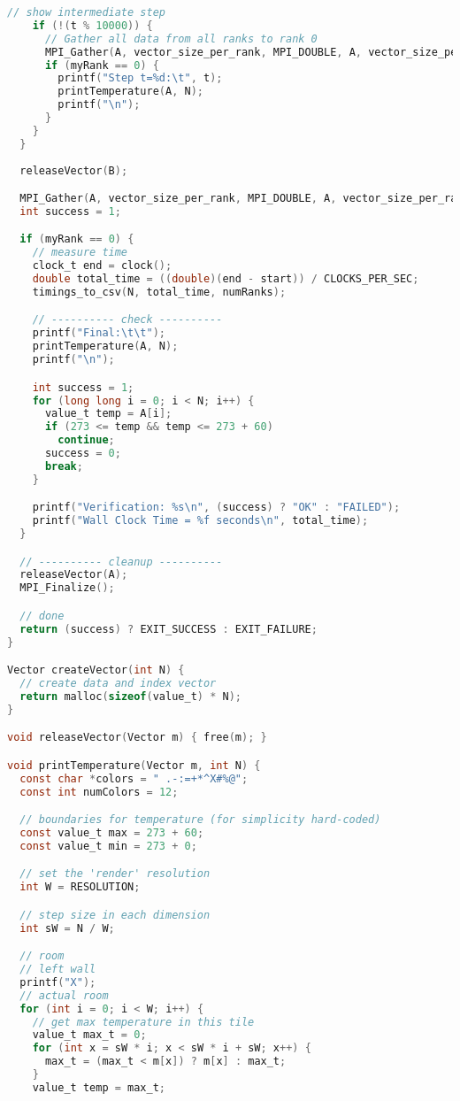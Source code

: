 \documentclass[UTF-8]{article}
\begin{document}
\begin{itemize}
\begin{enumerate}[label=\textbf{\arabic *)}]
\begin{lstlisting}[language=c]
    // show intermediate step
    if (!(t % 10000)) {
      // Gather all data from all ranks to rank 0
      MPI_Gather(A, vector_size_per_rank, MPI_DOUBLE, A, vector_size_per_rank, MPI_DOUBLE, 0, MPI_COMM_WORLD);
      if (myRank == 0) {
        printf("Step t=%d:\t", t);
        printTemperature(A, N);
        printf("\n");
      }
    }
  }
  
  releaseVector(B);

  MPI_Gather(A, vector_size_per_rank, MPI_DOUBLE, A, vector_size_per_rank, MPI_DOUBLE, 0, MPI_COMM_WORLD);
  int success = 1;

  if (myRank == 0) {
    // measure time
    clock_t end = clock();
    double total_time = ((double)(end - start)) / CLOCKS_PER_SEC;
    timings_to_csv(N, total_time, numRanks);

    // ---------- check ----------
    printf("Final:\t\t");
    printTemperature(A, N);
    printf("\n");

    int success = 1;
    for (long long i = 0; i < N; i++) {
      value_t temp = A[i];
      if (273 <= temp && temp <= 273 + 60)
        continue;
      success = 0;
      break;
    }

    printf("Verification: %s\n", (success) ? "OK" : "FAILED");
    printf("Wall Clock Time = %f seconds\n", total_time);
  }

  // ---------- cleanup ----------
  releaseVector(A);
  MPI_Finalize();

  // done
  return (success) ? EXIT_SUCCESS : EXIT_FAILURE;
}

Vector createVector(int N) {
  // create data and index vector
  return malloc(sizeof(value_t) * N);
}

void releaseVector(Vector m) { free(m); }

void printTemperature(Vector m, int N) {
  const char *colors = " .-:=+*^X#%@";
  const int numColors = 12;

  // boundaries for temperature (for simplicity hard-coded)
  const value_t max = 273 + 60;
  const value_t min = 273 + 0;

  // set the 'render' resolution
  int W = RESOLUTION;

  // step size in each dimension
  int sW = N / W;

  // room
  // left wall
  printf("X");
  // actual room
  for (int i = 0; i < W; i++) {
    // get max temperature in this tile
    value_t max_t = 0;
    for (int x = sW * i; x < sW * i + sW; x++) {
      max_t = (max_t < m[x]) ? m[x] : max_t;
    }
    value_t temp = max_t;


\end{lstlisting}
\end{enumerate}
\end{itemize}
\end{document}

